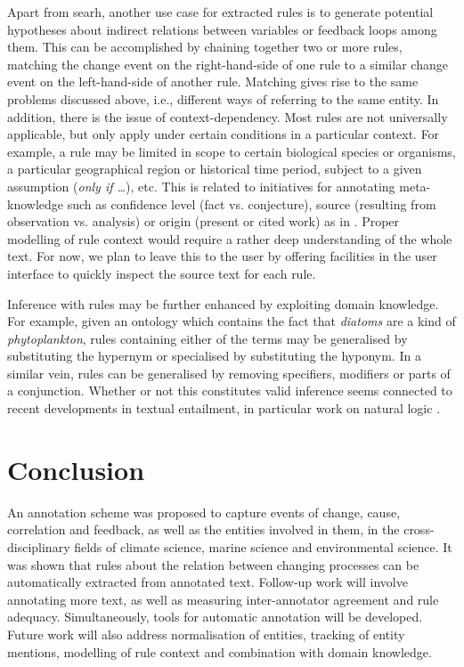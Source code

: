 \documentclass[10pt, a4paper]{article}
\begin{document}
Apart from searh, another use case for extracted rules is to generate potential hypotheses about indirect relations between variables or feedback loops among them.
This can be accomplished by chaining together two or more rules, matching the change event on the right-hand-side of one rule to a similar change event on the left-hand-side of another rule.
Matching gives rise to the same problems discussed above, i.e., different ways of referring to the same entity.
In addition, there is the issue of context-dependency.
Most rules are not universally applicable, but only apply under certain conditions in a particular context.
For example, a rule may be limited in scope to certain biological species or organisms, a particular geographical region or historical time period, subject to a given assumption (\emph{only if \ldots}), etc.
This is related to initiatives for annotating meta-knowledge such as confidence level (fact vs. conjecture), source (resulting from observation vs. analysis) or origin (present or cited work) as in  \cite{Thompson2011Enriching}.  
Proper modelling of rule context would require a rather deep understanding of the whole text. 
For now, we plan to leave this to the user by offering facilities in the user interface to quickly inspect the source text for each rule.

Inference with rules may be further enhanced by exploiting domain knowledge.
For example, given an ontology which contains the fact that \emph{diatoms} are a kind of \emph{phytoplankton}, rules containing either of the terms may be generalised by substituting the hypernym or specialised by substituting the hyponym.
In a similar vein, rules can be generalised by removing specifiers, modifiers or parts of a conjunction.
Whether or not this constitutes valid inference seems connected to recent developments in textual entailment, in particular work on natural logic \cite{MacCartney2008Modeling}.
    

\section{Conclusion}
\label{sec:conclusion}

An annotation scheme was proposed to capture events of change, cause, correlation and feedback, as well as  the entities involved in them, in the cross-disciplinary fields of climate science, marine science and environmental science.
It was shown that rules about the relation between changing processes can be automatically extracted from annotated text.
Follow-up work will involve annotating more text, as well as measuring inter-annotator agreement and rule adequacy.
Simultaneously, tools for automatic annotation will be developed.
Future work will also address normalisation of entities, tracking of entity mentions, modelling of rule context and combination with domain knowledge. 
\end{document}
